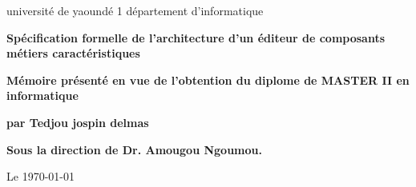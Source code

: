 \begin{titlepage}
\parindent=0pt
   université de yaoundé 1
département d'informatique 
\begin{center}
\end{center}
\hrulefill
\begin{center} \bfseries\Huge
Spécification  formelle de l'architecture d'un éditeur de composants métiers caractéristiques
\end{center}
\hrulefill
\vspace*{1cm}
\begin{center} \bfseries\Large
Mémoire présenté en vue de l'obtention du diplome de MASTER II en informatique
\end{center}
\begin{center}\bfseries\Large
par Tedjou jospin delmas
\end{center}
\begin{center} \bfseries\Large
Sous la direction de Dr. Amougou Ngoumou.
\end{center}
\begin{flushright}
 Le \today
\end{flushright}

\end{titlepage}
